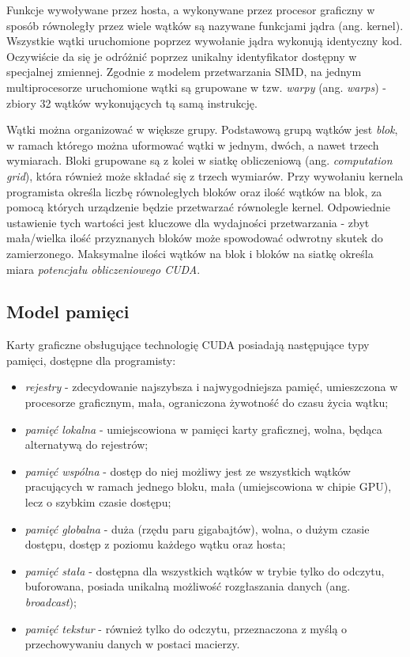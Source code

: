 \documentclass[12pt]{article}
\begin{document}
Funkcje wywoływane przez hosta, a wykonywane przez procesor graficzny w sposób równoległy przez wiele wątków są nazywane funkcjami jądra (ang. kernel). Wszystkie wątki uruchomione poprzez wywołanie jądra wykonują identyczny kod. Oczywiście da się je odróżnić poprzez unikalny identyfikator dostępny w specjalnej zmiennej. Zgodnie z modelem przetwarzania SIMD, na jednym multiprocesorze uruchomione wątki są grupowane w tzw. \textit{warpy} (ang. \textit{warps}) - zbiory 32 wątków wykonujących tą samą instrukcję.

Wątki można organizować w większe grupy. Podstawową grupą wątków jest \textit{blok}, w ramach którego można uformować wątki w jednym, dwóch, a nawet trzech wymiarach. Bloki grupowane są z kolei w siatkę obliczeniową (ang. \textit{computation grid}), która również może składać się z trzech wymiarów. Przy wywołaniu kernela programista określa liczbę równoległych bloków oraz ilość wątków na blok, za pomocą których urządzenie będzie przetwarzać równolegle kernel. Odpowiednie ustawienie tych wartości jest kluczowe dla wydajności przetwarzania - zbyt mała/wielka ilość przyznanych bloków może spowodować odwrotny skutek do zamierzonego. Maksymalne ilości wątków na blok i bloków na siatkę określa miara \textit{potencjału obliczeniowego CUDA}.

\subsection{Model pamięci}

Karty graficzne obsługujące technologię CUDA posiadają następujące typy pamięci, dostępne dla programisty:

\begin{itemize}
\item \textit{rejestry} - zdecydowanie najszybsza i najwygodniejsza pamięć, umieszczona w procesorze graficznym, mała, ograniczona żywotność do czasu życia wątku;
\item \textit{pamięć lokalna} - umiejscowiona w pamięci karty graficznej, wolna, będąca alternatywą do rejestrów;
\item \textit{pamięć wspólna} - dostęp do niej możliwy jest ze wszystkich wątków pracujących w ramach jednego bloku, mała (umiejscowiona w chipie GPU), lecz o szybkim czasie dostępu;
\item \textit{pamięć globalna} - duża (rzędu paru gigabajtów), wolna, o dużym czasie dostępu, dostęp z poziomu każdego wątku oraz hosta;
\item \textit{pamięć stała} - dostępna dla wszystkich wątków w trybie tylko do odczytu, buforowana, posiada unikalną możliwość rozgłaszania danych (ang. \textit{broadcast});
\item \textit{pamięć tekstur} - również tylko do odczytu, przeznaczona z myślą o przechowywaniu danych w postaci macierzy.
\end{itemize}
\end{document}
